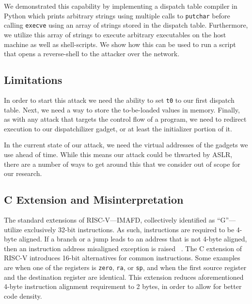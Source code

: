 We demonstrated this capability by implementing a dispatch table compiler in
Python which prints arbitrary strings using multiple calls to \verb|putchar|
before calling \verb|execve| using an array of strings stored in the dispatch
table. Furthermore, we utilize this array of strings to execute arbitrary
executables on the host machine as well as shell-scripts. We show how this can
be used to run a script that opens a reverse-shell to the attacker over the
network.


\subsection{Limitations}

In order to start this attack we need the ability to set \verb|t0| to our first
dispatch table. Next, we need a way to store the to-be-loaded values in memory.
Finally, as with any attack that targets the control flow of a program, we need
to redirect execution to our dispatchilizer gadget, or at least the initializer
portion of it.

In the current state of our attack, we need the virtual addresses of the
gadgets we use ahead of time. While this means our attack could be thwarted by
ASLR, there are a number of ways to get around this that we consider out of
scope for our research.


\subsection{C Extension and Misinterpretation}

The standard extensions of RISC-V---IMAFD, collectively identified as ``G''---%
utilize exclusively 32-bit instructions. As such, instructions are required to
be 4-byte aligned. If a branch or a jump leads to an address that is not 4-byte
aligned, then an instruction address misaligned exception is raised~%
\cite{riscvmanual}. The C extension of RISC-V introduces 16-bit alternatives for
common instructions. Some examples are when one of the registers is \verb|zero|,
\verb|ra|, or \verb|sp|, and when the first source register and the destination
register are identical. This extension reduces aforementioned 4-byte instruction
alignment requirement to 2 bytes, in order to allow for better code density.

